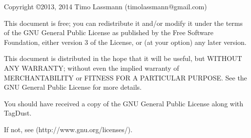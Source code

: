 \documentclass[11pt,a4paper,oneside]{book}
\begin{document}
\frontmatter
\newlength{\centeroffset}
\thispagestyle{empty}
\noindent\hspace*{\centeroffset}

\noindent\hspace*{\centeroffset}



\pagebreak
\begin{small} 

Copyright \copyright  2013, 2014 Timo Lassmann (timolassmann@gmail.com)
 
 This document is free;  you can redistribute it and/or modify
 it under the terms of the GNU General Public License as published by
 the Free Software Foundation, either version 3 of the License, or
 (at your option) any later version.
 
 This document is distributed in the hope that it will be useful,
 but WITHOUT ANY WARRANTY; without even the implied warranty of
 MERCHANTABILITY or FITNESS FOR A PARTICULAR PURPOSE.  See the
 GNU General Public License for more details.
 
 You should have received a copy of the GNU General Public License
 along with TagDust.  
 
 If not, see (http://www.gnu.org/licenses/).



\end{small}
\end{document}
